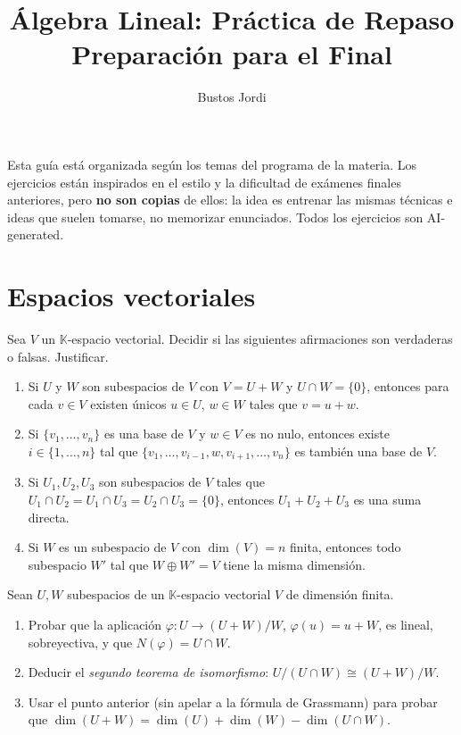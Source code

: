 \documentclass{article}
\newcommand{\K}{\mathbb{K}}
\DeclareMathOperator{\dimm}{dim}
\theoremstyle{plain}
\theoremstyle{definition}
\theoremstyle{remark}
\newenvironment{ejercicio}[1]{\begin{trivlist}
\item[\hskip \labelsep {\bfseries Ejercicio}\hskip \labelsep {\bfseries #1.}]}{\end{trivlist}}
\begin{document}
\title{Álgebra Lineal: Práctica de Repaso\\Preparación para el Final}
\author{Bustos Jordi}

\maketitle

\noindent Esta guía está organizada según los temas del programa de la materia. Los ejercicios están inspirados en el estilo y la dificultad de exámenes finales anteriores, pero \textbf{no son copias} de ellos: la idea es entrenar las mismas técnicas e ideas que suelen tomarse, no memorizar enunciados. Todos los ejercicios son AI-generated.

\tableofcontents

\section{Espacios vectoriales}

\begin{ejercicio}{1}
    Sea \(V\) un \(\K\)-espacio vectorial. Decidir si las siguientes afirmaciones son verdaderas o falsas. Justificar.
    \begin{enumerate}
        \item Si \(U\) y \(W\) son subespacios de \(V\) con \(V = U + W\) y \(U \cap W = \{0\}\), entonces para cada \(v \in V\) existen únicos \(u \in U\), \(w \in W\) tales que \(v = u+w\).
        \item Si \(\{v_1,\ldots,v_n\}\) es una base de \(V\) y \(w \in V\) es no nulo, entonces existe \(i \in \{1,\ldots,n\}\) tal que \(\{v_1,\ldots,v_{i-1},w,v_{i+1},\ldots,v_n\}\) es también una base de \(V\).
        \item Si \(U_1, U_2, U_3\) son subespacios de \(V\) tales que \(U_1 \cap U_2 = U_1 \cap U_3 = U_2 \cap U_3 = \{0\}\), entonces \(U_1 + U_2 + U_3\) es una suma directa.
        \item Si \(W\) es un subespacio de \(V\) con \(\dimm(V) = n\) finita, entonces todo subespacio \(W'\) tal que \(W \oplus W' = V\) tiene la misma dimensión.
    \end{enumerate}
\end{ejercicio}

\begin{ejercicio}{2}
    Sean \(U, W\) subespacios de un \(\K\)-espacio vectorial \(V\) de dimensión finita.
    \begin{enumerate}
        \item Probar que la aplicación \(\varphi : U \to (U+W)/W\), \(\varphi(u) = u+W\), es lineal, sobreyectiva, y que \(N(\varphi) = U \cap W\).
        \item Deducir el \emph{segundo teorema de isomorfismo}: \(U/(U\cap W) \cong (U+W)/W\).
        \item Usar el punto anterior (sin apelar a la fórmula de Grassmann) para probar que \(\dimm(U+W) = \dimm(U)+\dimm(W)-\dimm(U\cap W)\).
    \end{enumerate}
\end{ejercicio}
\end{document}
